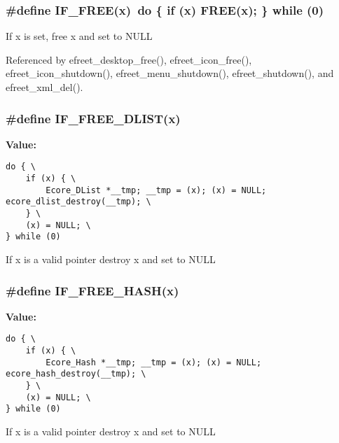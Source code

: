 \subsubsection{\setlength{\rightskip}{0pt plus 5cm}\#define IF\_\-FREE(x)~do \{ if (x) FREE(x); \} while (0)}\label{group__Efreet__Private_g3add950b6c67618ac81dfe4e8a69b576}


If x is set, free x and set to NULL 

Referenced by efreet\_\-desktop\_\-free(), efreet\_\-icon\_\-free(), efreet\_\-icon\_\-shutdown(), efreet\_\-menu\_\-shutdown(), efreet\_\-shutdown(), and efreet\_\-xml\_\-del().
\subsubsection{\setlength{\rightskip}{0pt plus 5cm}\#define IF\_\-FREE\_\-DLIST(x)}\label{group__Efreet__Private_gcd7b583c33297ee7e359b055767fed34}


\textbf{Value:}

\begin{Code}\begin{verbatim}do { \
    if (x) { \
        Ecore_DList *__tmp; __tmp = (x); (x) = NULL; ecore_dlist_destroy(__tmp); \
    } \
    (x) = NULL; \
} while (0)
\end{verbatim}
\end{Code}
If x is a valid pointer destroy x and set to NULL 
\subsubsection{\setlength{\rightskip}{0pt plus 5cm}\#define IF\_\-FREE\_\-HASH(x)}\label{group__Efreet__Private_g2ef24d62b8a9a79cd511410826b1908d}


\textbf{Value:}

\begin{Code}\begin{verbatim}do { \
    if (x) { \
        Ecore_Hash *__tmp; __tmp = (x); (x) = NULL; ecore_hash_destroy(__tmp); \
    } \
    (x) = NULL; \
} while (0)
\end{verbatim}
\end{Code}
If x is a valid pointer destroy x and set to NULL 

